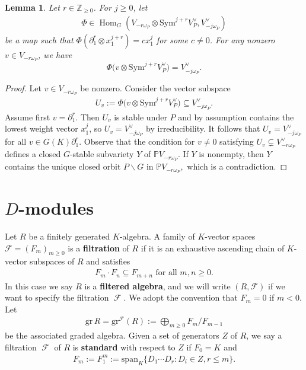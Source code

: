 \documentclass[11pt,a4paper,usenames,dvipsnames,reqno]{amsart}
\numberwithin{equation}{section}
\newcommand{\zz}{\mathbb Z}
\DeclareMathOperator{\Hom}{Hom}
\DeclareMathOperator{\calf}{\mathcal{F}}
\newtheorem{Lem}[Thm]{Lemma}
\theoremstyle{definition}
\theoremstyle{remark}
\begin{document}
\begin{Lem}\label{lem:fullentry}
Let $r\in \zz_{\ge 0}$. For $j\ge 0$, let
\begin{align*}
  \Phi\in \Hom_G(V_{-r\omega_P}\otimes \mathrm{Sym}^{j+r} V_P^\lor, V_{-j\omega_P}^\lor)
\end{align*}
be a map such that $\Phi(\partial_1^r \otimes x_1^{j+r})=c x_1^{j}$ for some $c\neq 0$. For any nonzero $v\in V_{-r\omega_P}$, we have $$\Phi\Big(v\otimes \mathrm{Sym}^{j+r} V_P^\lor\Big)=V_{-j\omega_P}^\lor.$$
\end{Lem}

\begin{proof}
Let $v\in V_{-r\omega_P}$ be nonzero. Consider the vector subspace  
\begin{align*}
     U_v:=\Phi\Big(v\otimes \mathrm{Sym}^{j+r} V_P^\lor\Big)\subseteq V_{-j\omega_P}^\lor.
\end{align*}
Assume first $v=\partial_1^r$. Then $U_v$ is stable under $P$ and by assumption contains the lowest weight vector $x_1^j$, so $U_v=V_{-j\omega_P}^\lor$ by irreducibility. It follows that $U_v=V_{-j\omega_P}^\lor$ for all $v\in G(K)\partial_1^r$. Observe that the condition for $v\neq 0$ satisfying $U_v\subsetneq V_{-r\omega_P}^\lor $ defines a closed $G$-stable subvariety $Y$ of $\mathbb{P}V_{-r\omega_P}$. If $Y$ is nonempty, then $Y$ contains the unique closed orbit $P\backslash G$ in $\mathbb{P}V_{-r\omega_P},$ which is a contradiction.
\end{proof}








\section{$D$-modules}

Let $R$ be a finitely generated $K$-algebra. A family of $K$-vector spaces $\mathcal{F}=(F_m)_{m\ge 0}$ is a \textbf{filtration} of $R$ if
it is an exhaustive ascending chain of $K$-vector subspaces of $R$ and satisfies
\begin{align*}
    F_m\cdot F_n\subseteq F_{m+n} \textrm{ for all } m,n\ge 0.
\end{align*}
In this case we say $R$ is a \textbf{filtered algebra}, and we will write $(R,\mathcal{F})$ if we want to specify the filtration $\calf$. We adopt the convention that $F_m=0$ if $m<0$. Let
\begin{align*}
    \mathrm{gr}\, R=\mathrm{gr}^{\calf}(R):=\bigoplus_{m\ge 0} F_m/F_{m-1}
\end{align*}
be the associated graded algebra. Given a set of generators $Z$ of $R$, we say a filtration $\calf$ of $R$ is \textbf{standard} with respect to $Z$ if $F_0=K$ and
\begin{align*}
    F_m:=F_1^m:=\mathrm{span}_K\{ D_1\cdots D_r: D_i\in Z, r\le m\}.
\end{align*}
\end{document}
